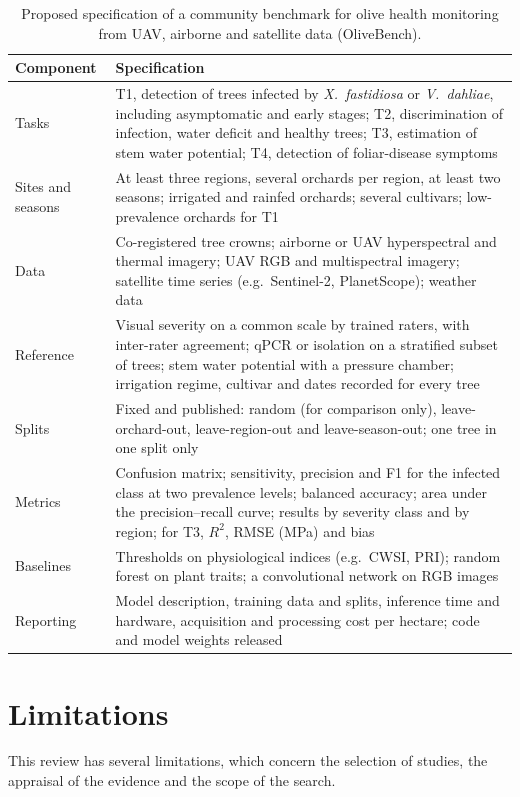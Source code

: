 \documentclass[preprint,12pt]{elsarticle}
\begin{document}
\begin{table}[H]\centering\footnotesize
\caption{Proposed specification of a community benchmark for olive health monitoring from UAV, airborne and satellite data (OliveBench).}\label{tab:bench}
\begin{tabular}{@{}L{2.29cm}L{10.57cm}@{}}\toprule
Component & Specification\\\midrule
Tasks & T1, detection of trees infected by \textit{X.~fastidiosa} or \textit{V.~dahliae}, including asymptomatic and early stages; T2, discrimination of infection, water deficit and healthy trees; T3, estimation of stem water potential; T4, detection of foliar-disease symptoms\\
Sites and seasons & At least three regions, several orchards per region, at least two seasons; irrigated and rainfed orchards; several cultivars; low-prevalence orchards for T1\\
Data & Co-registered tree crowns; airborne or UAV hyperspectral and thermal imagery; UAV RGB and multispectral imagery; satellite time series (e.g.\ Sentinel-2, PlanetScope); weather data\\
Reference & Visual severity on a common scale by trained raters, with inter-rater agreement; qPCR or isolation on a stratified subset of trees; stem water potential with a pressure chamber; irrigation regime, cultivar and dates recorded for every tree\\
Splits & Fixed and published: random (for comparison only), leave-orchard-out, leave-region-out and leave-season-out; one tree in one split only\\
Metrics & Confusion matrix; sensitivity, precision and F1 for the infected class at two prevalence levels; balanced accuracy; area under the precision--recall curve; results by severity class and by region; for T3, $R^2$, RMSE (MPa) and bias\\
Baselines & Thresholds on physiological indices (e.g.\ CWSI, PRI); random forest on plant traits; a convolutional network on RGB images\\
Reporting & Model description, training data and splits, inference time and hardware, acquisition and processing cost per hectare; code and model weights released\\\bottomrule
\end{tabular}\end{table}

\section{Limitations}\label{sec:limits}
This review has several limitations, which concern the selection of studies, the appraisal of the evidence and the scope of the search.
\end{document}
